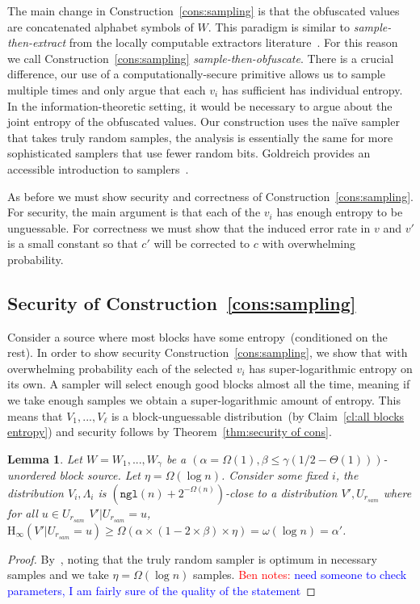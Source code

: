 \documentclass[11pt]{article}
\newcommand{\thref}[1]{\mbox{Theorem~\ref{#1}}}
\newcommand{\clref}[1]{\mbox{Claim~\ref{#1}}}
\newcommand{\consref}[1]{\mbox{Construction~\ref{#1}}}
\newcommand{\ngl}{\ensuremath{\mathtt{ngl}}\xspace}
\newcommand{\Hoo}{\mathrm{H}_\infty}
\newtheorem{lemma}[theorem]{Lemma}
\newcommand{\authnote}[2]{{\textcolor{red}{\textsf{#1 notes: }\textcolor{blue}{ #2}}\marginpar{\textcolor{red}{\textbf{!!!!!}}}}}
\newcommand{\authnote}[2]{}
\newcommand{\bnote}[1]{{\authnote{Ben}{#1}}}
\begin{document}
The main change in \consref{cons:sampling} is that the obfuscated values are concatenated alphabet symbols of $W$.  This paradigm is similar to \emph{sample-then-extract} from the locally computable extractors literature~\cite{lu2002hyper,vadhan2003constructing}.  For this reason we call \consref{cons:sampling} \emph{sample-then-obfuscate}.  There is a crucial difference, our use of a computationally-secure primitive allows us to sample multiple times and only argue that each $v_i$ has sufficient has individual entropy.  In the information-theoretic setting, it would be necessary to argue about the joint entropy of the obfuscated values.  Our construction uses the na\"{i}ve sampler that takes truly random samples, the analysis is essentially the same for more sophisticated samplers that use fewer random bits.  Goldreich provides an accessible introduction to samplers~\cite{goldreich1997sample}.

As before we must show security and correctness of \consref{cons:sampling}.  For security, the main argument is that each of the $v_i$ has enough entropy to be unguessable.  For correctness we must show that the induced error rate in $v$ and $v'$ is a small constant so that $c'$ will be corrected to $c$ with overwhelming probability.

\subsection{Security of \consref{cons:sampling}}
Consider a source where most blocks have some entropy~(conditioned on the rest).
In order to show security \consref{cons:sampling}, we show that with overwhelming probability each of the selected $v_i$ has super-logarithmic entropy on its own.  A sampler will select enough good blocks almost all the time, meaning if we take enough samples we obtain a super-logarithmic amount of entropy.  This means that  $V_1,..., V_\ell$ is a block-unguessable distribution~(by \clref{cl:all blocks entropy}) and security follows by \thref{thm:security of cons}.     

\begin{lemma}
\label{lem:sampling works}
Let $W = W_1,..., W_\gamma$ be a $(\alpha = \Omega(1), \beta \leq \gamma(1/2-\Theta(1)))$-unordered block source.  Let $\eta = \Omega(\log n)$. Consider some fixed $i$, the distribution $V_{i}, \Lambda_i$ is $(\ngl(n)+ 2^{-\Omega(n)})$-close to a distribution $V', U_{r_{sam}}$ where for all $u\in U_{r_{sam}}$ $V' | U_{r_{sam}}=u$, $\Hoo(V' | U_{r_{sam}}=u) \geq \Omega(\alpha\times (1-2\times \beta) \times \eta) = \omega(\log n) = \alpha'$.
\end{lemma}
\begin{proof}
By~\cite[Lemma 9]{vadhan2003constructing}, noting that the truly random sampler is optimum in necessary samples and we take $\eta = \Omega(\log n)$ samples.  \bnote{need someone to check parameters, I am fairly sure of the quality of the statement}
\end{proof}
\end{document}
